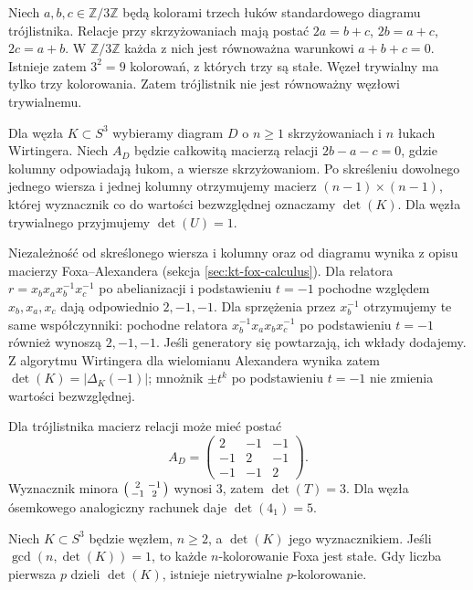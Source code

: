 \begin{przyklad}
Niech $a,b,c\in\mathbb Z/3\mathbb Z$ będą kolorami trzech łuków
standardowego diagramu trójlistnika. Relacje przy skrzyżowaniach
mają postać $2a=b+c$, $2b=a+c$, $2c=a+b$.
W $\mathbb Z/3\mathbb Z$ każda z nich jest równoważna warunkowi
$a+b+c=0$. Istnieje zatem $3^2=9$ kolorowań, z których
trzy są stałe. Węzeł trywialny ma tylko trzy kolorowania.
Zatem trójlistnik nie jest równoważny węzłowi trywialnemu.
\end{przyklad}

\begin{definicja}
Dla węzła $K\subset S^3$ wybieramy diagram $D$ o $n\geq1$
skrzyżowaniach i $n$ łukach Wirtingera. Niech $A_D$ będzie całkowitą macierzą
relacji $2b-a-c=0$, gdzie kolumny odpowiadają łukom, a wiersze
skrzyżowaniom. Po skreśleniu dowolnego jednego wiersza i jednej
kolumny otrzymujemy macierz $(n-1)\times(n-1)$, której wyznacznik
co do wartości bezwzględnej oznaczamy $\det(K)$.
Dla węzła trywialnego przyjmujemy $\det(U)=1$.
\end{definicja}

Niezależność od skreślonego wiersza i kolumny oraz od diagramu
wynika z opisu macierzy Foxa--Alexandera
(sekcja \ref{sec:kt-fox-calculus}).
Dla relatora $r=x_bx_ax_b^{-1}x_c^{-1}$ po abelianizacji
i podstawieniu $t=-1$ pochodne względem $x_b,x_a,x_c$
dają odpowiednio $2,-1,-1$. Dla sprzężenia przez
$x_b^{-1}$ otrzymujemy te same współczynniki:
pochodne relatora $x_b^{-1}x_ax_bx_c^{-1}$ po podstawieniu
$t=-1$ również wynoszą $2,-1,-1$. Jeśli generatory
się powtarzają, ich wkłady dodajemy.
Z algorytmu Wirtingera dla wielomianu Alexandera wynika
zatem $\det(K)=|\Delta_K(-1)|$; mnożnik $\pm t^k$
po podstawieniu $t=-1$ nie zmienia wartości bezwzględnej.

\begin{przyklad}
Dla trójlistnika macierz relacji może mieć postać
\[
A_D=\begin{pmatrix}2&-1&-1\\-1&2&-1\\-1&-1&2\end{pmatrix}.
\]
Wyznacznik minora $\begin{psmallmatrix}2&-1\\-1&2\end{psmallmatrix}$
wynosi $3$, zatem $\det(T)=3$. Dla węzła ósemkowego
analogiczny rachunek daje $\det(4_1)=5$.
\end{przyklad}

\begin{stwierdzenie}
Niech $K\subset S^3$ będzie węzłem, $n\ge2$, a
$\det(K)$ jego wyznacznikiem. Jeśli
$\gcd(n,\det(K))=1$, to każde $n$-kolorowanie Foxa
jest stałe. Gdy liczba pierwsza $p$ dzieli $\det(K)$,
istnieje nietrywialne $p$-kolorowanie.
\end{stwierdzenie}

